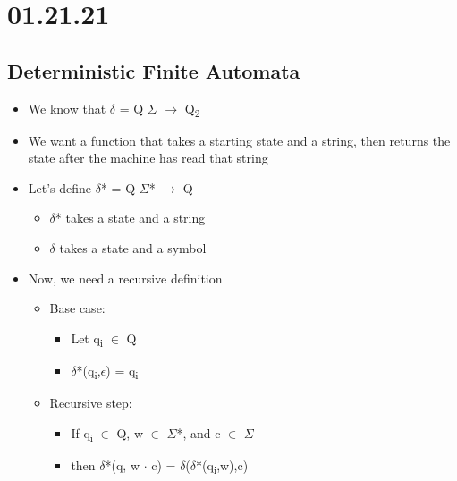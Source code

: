\documentclass[11pt]{article}
\author{Sudhan Chitgopkar}
\date{\today}
\title{}
\begin{document}
\tableofcontents \clearpage\section{01.21.21}
\label{sec:org1888593}
\subsection{Deterministic Finite Automata}
\label{sec:org8faaa67}
\begin{itemize}
\item We know that \(\delta\) = Q \texttimes{} \(\Sigma\) \(\to\) Q\textsubscript{2}
\item We want a function that takes a starting state and a string, then returns the state after the machine has read that string
\item Let's define \(\delta\)* = Q \texttimes{} \(\Sigma\)* \(\to\) Q
\begin{itemize}
\item \(\delta\)* takes a state and a string
\item \(\delta\) takes a state and a symbol
\end{itemize}
\item Now, we need a recursive definition
\begin{itemize}
\item Base case:
\begin{itemize}
\item Let q\textsubscript{i} \(\in\) Q
\item \(\delta\)*(q\textsubscript{i},\(\epsilon\)) = q\textsubscript{i}
\end{itemize}
\item Recursive step:
\begin{itemize}
\item If q\textsubscript{i} \(\in\) Q, w \(\in\) \(\Sigma\)*, and c \(\in\) \(\Sigma\)
\item then \(\delta\)*(q, w \(\cdot\) c) = \(\delta\)(\(\delta\)*(q\textsubscript{i},w),c)
\end{itemize}
\end{itemize}
\end{itemize}
\end{document}
